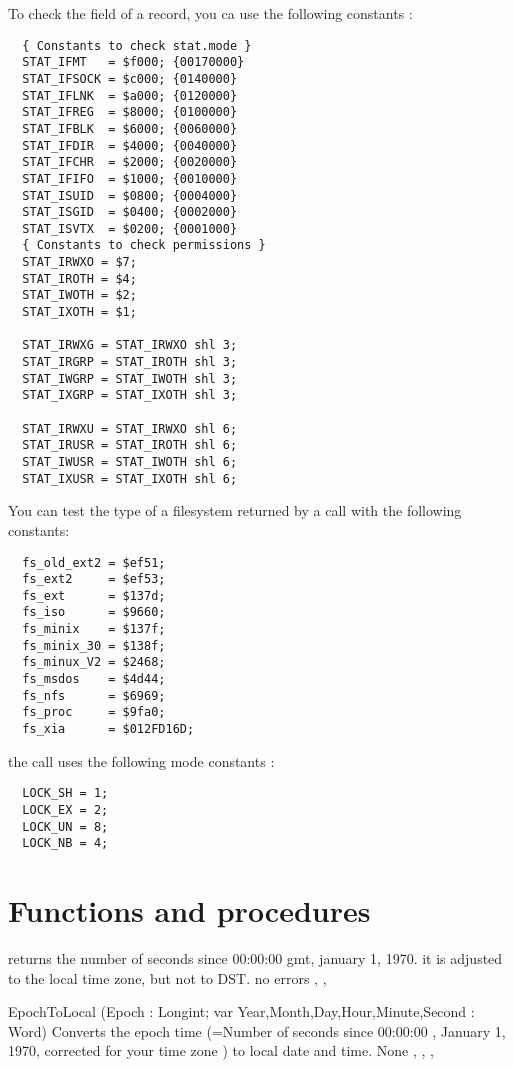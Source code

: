 To check the  field of a  record, you ca use the
following constants :
\begin{verbatim}
  { Constants to check stat.mode }
  STAT_IFMT   = $f000; {00170000}
  STAT_IFSOCK = $c000; {0140000}
  STAT_IFLNK  = $a000; {0120000}
  STAT_IFREG  = $8000; {0100000}
  STAT_IFBLK  = $6000; {0060000}
  STAT_IFDIR  = $4000; {0040000}
  STAT_IFCHR  = $2000; {0020000}
  STAT_IFIFO  = $1000; {0010000}
  STAT_ISUID  = $0800; {0004000}
  STAT_ISGID  = $0400; {0002000}
  STAT_ISVTX  = $0200; {0001000}
  { Constants to check permissions }
  STAT_IRWXO = $7;
  STAT_IROTH = $4;
  STAT_IWOTH = $2;
  STAT_IXOTH = $1;

  STAT_IRWXG = STAT_IRWXO shl 3;
  STAT_IRGRP = STAT_IROTH shl 3;
  STAT_IWGRP = STAT_IWOTH shl 3;
  STAT_IXGRP = STAT_IXOTH shl 3;

  STAT_IRWXU = STAT_IRWXO shl 6;
  STAT_IRUSR = STAT_IROTH shl 6;
  STAT_IWUSR = STAT_IWOTH shl 6;
  STAT_IXUSR = STAT_IXOTH shl 6;
\end{verbatim}
You can test the type of a filesystem returned by a  call with
the following constants:
\begin{verbatim}
  fs_old_ext2 = $ef51;
  fs_ext2     = $ef53;
  fs_ext      = $137d;
  fs_iso      = $9660;
  fs_minix    = $137f;
  fs_minix_30 = $138f;
  fs_minux_V2 = $2468;
  fs_msdos    = $4d44;
  fs_nfs      = $6969;
  fs_proc     = $9fa0;
  fs_xia      = $012FD16D;
\end{verbatim}
the  call uses the following mode constants :
\begin{verbatim}
  LOCK_SH = 1;
  LOCK_EX = 2;
  LOCK_UN = 8;
  LOCK_NB = 4;
\end{verbatim}

\section{Functions and procedures}

{
returns the number of seconds since 00:00:00 gmt, january 1, 1970.
it is adjusted to the local time zone, but not to DST.
}
{no errors}
{, , }



\procedure
{EpochToLocal}
{(Epoch : Longint; var Year,Month,Day,Hour,Minute,Second : Word)}
{
Converts the epoch time (=Number of seconds since 00:00:00 , January 1,
1970, corrected for your time zone ) to local date and time.
}
{None}
{, , , }

